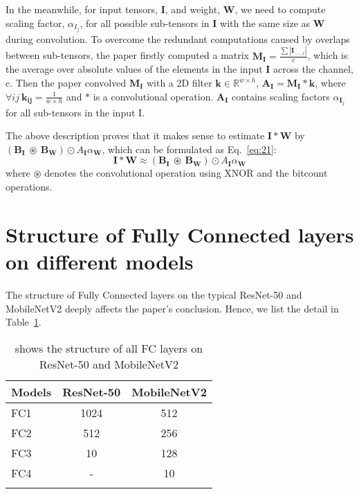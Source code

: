 \documentclass[sn-mathphys,iicol,Numbered]{sn-jnl}
\begin{document}
\begin{appendices}
In the meanwhile, for input tensors, $\mathbf{I}$, and weight, $\mathbf{W}$, we need to compute scaling factor, $\alpha_{I_{j}}$, for all possible sub-tensors in $\mathbf{I}$ with the same size as $\mathbf{W}$ during convolution. To overcome the redundant computations caused by overlaps between sub-tensors, the paper firstly computed a matrix $\mathbf{M_{I}}=\frac{\sum|\mathbf{I}_{:,:,i}|}{c}$, which is the average over absolute values of the elements in the input $\mathbf{I}$ across the channel, c. Then the paper convolved $\mathbf{M_{I}}$ with a 2D filter $\mathbf{k}\in \mathbb{R}^{w\times h}$, $\mathbf{A_{I}} = \mathbf{M_{I}}*\mathbf{k}$, where $\forall ij\ \mathbf{k_{ij}}=\frac{1}{w\times h}$ and $*$ is a convolutional operation. $\mathbf{A_{I}}$ contains scaling factors $\alpha_{\mathbf{I}_{j}}$ for all sub-tensors in the input I.

The above description proves that it makes sense to estimate $\mathbf{I}*\mathbf{W}$ by $(\mathbf{B_{I}}\ \circledast\ \mathbf{B_{W}}) \odot A_{\mathbf{I}}\alpha_{\mathbf{W}}$, which can be formulated as Eq.~\ref{eq:21}:
\vspace{-0.2cm}
\begin{equation} \label{eq:21}
\mathbf{I}*\mathbf{W} \approx (\mathbf{B_{I}}\ \circledast\ \mathbf{B_{W}}) \odot A_{\mathbf{I}}\alpha_{\mathbf{W}}
\end{equation}
where $\circledast$ denotes the convolutional operation using XNOR and the bitcount operations. 

\section{Structure of Fully Connected layers on different models}
\label{appendix:C}

The structure of Fully Connected layers on the typical ResNet-50 and MobileNetV2 deeply affects the paper's conclusion. Hence, we list the detail in Table~\ref{tab:fc_structure}.

\begin{table}[ht]
\caption{shows the structure of all FC layers on ResNet-50 and MobileNetV2}\label{tab:fc_structure}
\begin{tabular}{@{}l|c|c@{}}
\toprule
Models & ResNet-50 & MobileNetV2 \\
\midrule
FC1 & 1024 & 512 \\
FC2 & 512 & 256 \\
FC3 & 10 & 128 \\
FC4 & - & 10 \\ 
\botrule
\end{tabular}
\end{table}







\end{appendices}
\end{document}
